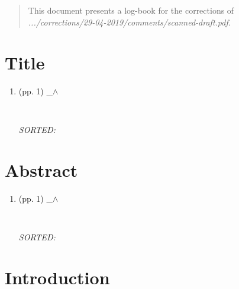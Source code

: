 \documentclass[12pt]{article}
\begin{document}
\maketitle


\begin{abstract}
This document presents a log-book for the corrections
of \emph{.../corrections/29-04-2019/comments/scanned-draft.pdf}.
\end{abstract}




\section{Title}


\begin{enumerate}

\item  (pp. 1)  \_$\wedge$  

	\begin{verbatim}
	
	\end{verbatim}
	\textit{
	SORTED:  
	}
	\\


\end{enumerate}



\section{Abstract}


\begin{enumerate}

\item  (pp. 1)  \_$\wedge$  

	\begin{verbatim}
	
	\end{verbatim}
	\textit{
	SORTED:  
	}
	\\


\end{enumerate}




\section{Introduction}
\end{document}
